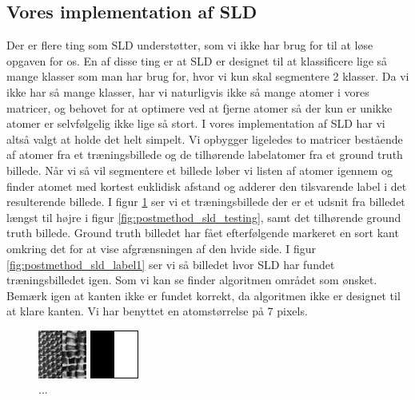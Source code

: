 \subsection{Vores implementation af SLD}
Der er flere ting som SLD understøtter, som vi ikke har brug for til at løse opgaven for os. En af disse ting er at SLD er designet til at klassificere lige så mange klasser som man har brug for, hvor vi kun skal segmentere 2 klasser. Da vi ikke har så mange klasser, har vi naturligvis ikke så mange atomer i vores matricer, og behovet for at optimere ved at fjerne atomer så der kun er unikke atomer er selvfølgelig ikke lige så stort. I vores implementation af SLD har vi altså valgt at holde det helt simpelt. Vi opbygger ligeledes to matricer bestående af atomer fra et træningsbillede og de tilhørende labelatomer fra et ground truth billede. Når vi så vil segmentere et billede løber vi listen af atomer igennem og finder atomet med kortest euklidisk afstand og adderer den tilsvarende label i det resulterende billede. I figur \ref{fig:postmethod_sld_train1} ser vi et træningsbillede der er et udsnit fra billedet længst til højre i figur \ref{fig:postmethod_sld_testing}, samt det tilhørende ground truth billede. Ground truth billedet har fået efterfølgende markeret en sort kant omkring det for at vise afgrænsningen af den hvide side. I figur \ref{fig:postmethod_sld_label1} ser vi så billedet hvor SLD har fundet træningsbilledet igen. Som vi kan se finder algoritmen området som ønsket. Bemærk igen at kanten ikke er fundet korrekt, da algoritmen ikke er designet til at klare kanten. %
Vi har benyttet en atomstørrelse på 7 pixels. %

\begin{figure}[H]
	\begin{minipage}[b]{0.5\linewidth}
		\centering
		\includegraphics[scale=3]{files/postmethod/img/imTrain.png}
	\end{minipage}
	\hspace{0.5cm}
	\begin{minipage}[b]{0.5\linewidth}
		\centering
		\includegraphics[scale=3]{files/postmethod/img/imGT.png}
	\end{minipage}
	\caption{...\label{fig:postmethod_sld_train1}}
\end{figure}

